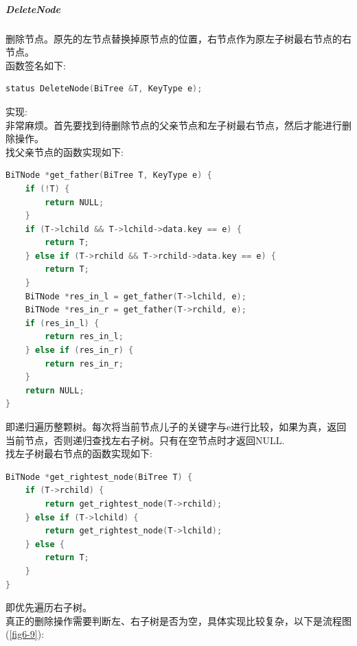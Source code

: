 \documentclass[supercite]{Experimental_Report}
\theoremstyle{definition}
\begin{document}
\subparagraph{DeleteNode}
\noindent
删除节点。原先的左节点替换掉原节点的位置，右节点作为原左子树最右节点的右节点。 \\
函数签名如下:
\begin{lstlisting}[language=C++, frame=single]
status DeleteNode(BiTree &T, KeyType e);
\end{lstlisting}
实现: \\
非常麻烦。首先要找到待删除节点的父亲节点和左子树最右节点，然后才能进行删除操作。 \\
找父亲节点的函数实现如下:
\begin{lstlisting}[language=C++, frame=single]
BiTNode *get_father(BiTree T, KeyType e) {
	if (!T) {
		return NULL;
	}
	if (T->lchild && T->lchild->data.key == e) {
		return T;
	} else if (T->rchild && T->rchild->data.key == e) {
		return T;
	}
	BiTNode *res_in_l = get_father(T->lchild, e);
	BiTNode *res_in_r = get_father(T->rchild, e);
	if (res_in_l) {
		return res_in_l;
	} else if (res_in_r) {
		return res_in_r;
	}
	return NULL;
}
\end{lstlisting}
即递归遍历整颗树。每次将当前节点儿子的关键字与e进行比较，如果为真，返回当前节点，否则递归查找左右子树。只有在空节点时才返回NULL. \\
找左子树最右节点的函数实现如下:
\begin{lstlisting}[language=C++, frame=single]
BiTNode *get_rightest_node(BiTree T) {
	if (T->rchild) {
		return get_rightest_node(T->rchild);
	} else if (T->lchild) {
		return get_rightest_node(T->lchild);
	} else {
		return T;
	}
}
\end{lstlisting}
即优先遍历右子树。\\
真正的删除操作需要判断左、右子树是否为空，具体实现比较复杂，以下是流程图(\ref{fig6-9}):
\end{document}
